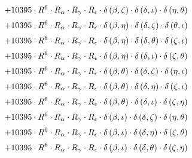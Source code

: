 \begin{subequations}
\begin{gather}
 \\[0.2em] \notag 		 + 10395 \cdot R^{6} \cdot R_{\alpha{}} \cdot R_{\gamma{}} \cdot R_{\epsilon{}} \cdot \delta{}\left(\beta{}, \zeta{}\right) \cdot \delta{}\left(\delta{}, \iota{}\right) \cdot \delta{}\left(\eta{}, \theta{}\right) 
 \\[0.2em] \notag 		 + 10395 \cdot R^{6} \cdot R_{\alpha{}} \cdot R_{\gamma{}} \cdot R_{\epsilon{}} \cdot \delta{}\left(\beta{}, \eta{}\right) \cdot \delta{}\left(\delta{}, \zeta{}\right) \cdot \delta{}\left(\theta{}, \iota{}\right) 
 \\[0.2em] \notag 		 + 10395 \cdot R^{6} \cdot R_{\alpha{}} \cdot R_{\gamma{}} \cdot R_{\epsilon{}} \cdot \delta{}\left(\beta{}, \eta{}\right) \cdot \delta{}\left(\delta{}, \theta{}\right) \cdot \delta{}\left(\zeta{}, \iota{}\right) 
 \\[0.2em] \notag 		 + 10395 \cdot R^{6} \cdot R_{\alpha{}} \cdot R_{\gamma{}} \cdot R_{\epsilon{}} \cdot \delta{}\left(\beta{}, \eta{}\right) \cdot \delta{}\left(\delta{}, \iota{}\right) \cdot \delta{}\left(\zeta{}, \theta{}\right) 
 \\[0.2em] \notag 		 + 10395 \cdot R^{6} \cdot R_{\alpha{}} \cdot R_{\gamma{}} \cdot R_{\epsilon{}} \cdot \delta{}\left(\beta{}, \theta{}\right) \cdot \delta{}\left(\delta{}, \zeta{}\right) \cdot \delta{}\left(\eta{}, \iota{}\right) 
 \\[0.2em] \notag 		 + 10395 \cdot R^{6} \cdot R_{\alpha{}} \cdot R_{\gamma{}} \cdot R_{\epsilon{}} \cdot \delta{}\left(\beta{}, \theta{}\right) \cdot \delta{}\left(\delta{}, \eta{}\right) \cdot \delta{}\left(\zeta{}, \iota{}\right) 
 \\[0.2em] \notag 		 + 10395 \cdot R^{6} \cdot R_{\alpha{}} \cdot R_{\gamma{}} \cdot R_{\epsilon{}} \cdot \delta{}\left(\beta{}, \theta{}\right) \cdot \delta{}\left(\delta{}, \iota{}\right) \cdot \delta{}\left(\zeta{}, \eta{}\right) 
 \\[0.2em] \notag 		 + 10395 \cdot R^{6} \cdot R_{\alpha{}} \cdot R_{\gamma{}} \cdot R_{\epsilon{}} \cdot \delta{}\left(\beta{}, \iota{}\right) \cdot \delta{}\left(\delta{}, \zeta{}\right) \cdot \delta{}\left(\eta{}, \theta{}\right) 
 \\[0.2em] \notag 		 + 10395 \cdot R^{6} \cdot R_{\alpha{}} \cdot R_{\gamma{}} \cdot R_{\epsilon{}} \cdot \delta{}\left(\beta{}, \iota{}\right) \cdot \delta{}\left(\delta{}, \eta{}\right) \cdot \delta{}\left(\zeta{}, \theta{}\right) 
 \\[0.2em] \notag 		 + 10395 \cdot R^{6} \cdot R_{\alpha{}} \cdot R_{\gamma{}} \cdot R_{\epsilon{}} \cdot \delta{}\left(\beta{}, \iota{}\right) \cdot \delta{}\left(\delta{}, \theta{}\right) \cdot \delta{}\left(\zeta{}, \eta{}\right) 

\end{gather}
\end{subequations}
